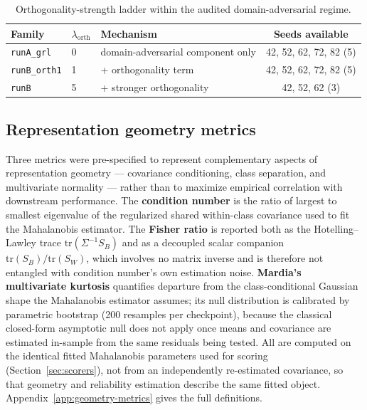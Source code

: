 \begin{table}[t]
\centering
\caption{Orthogonality-strength ladder within the audited domain-adversarial regime.}
\label{tab:ladder}
\small
\begin{tabular}{lllc}
\toprule
Family & $\lambda_{\mathrm{orth}}$ & Mechanism & Seeds available \\
\midrule
\texttt{runA\_grl} & 0 & domain-adversarial component only & 42, 52, 62, 72, 82 (5) \\
\texttt{runB\_orth1} & 1 & + orthogonality term & 42, 52, 62, 72, 82 (5) \\
\texttt{runB} & 5 & + stronger orthogonality & 42, 52, 62 (3) \\
\bottomrule
\end{tabular}
\end{table}

\subsection{Representation geometry metrics}
\label{sec:geometry-metrics}

Three metrics were pre-specified to represent complementary aspects of representation geometry --- covariance conditioning, class separation, and multivariate normality --- rather than to maximize empirical correlation with downstream performance. The \textbf{condition number} is the ratio of largest to smallest eigenvalue of the regularized shared within-class covariance used to fit the Mahalanobis estimator. The \textbf{Fisher ratio} is reported both as the Hotelling--Lawley trace $\mathrm{tr}(\Sigma^{-1}S_B)$ and as a decoupled scalar companion $\mathrm{tr}(S_B)/\mathrm{tr}(S_W)$, which involves no matrix inverse and is therefore not entangled with condition number's own estimation noise. \textbf{Mardia's multivariate kurtosis} \citep{mardia1970measures} quantifies departure from the class-conditional Gaussian shape the Mahalanobis estimator assumes; its null distribution is calibrated by parametric bootstrap (200 resamples per checkpoint), because the classical closed-form asymptotic null does not apply once means and covariance are estimated in-sample from the same residuals being tested. All are computed on the identical fitted Mahalanobis parameters used for scoring (Section~\ref{sec:scorers}), not from an independently re-estimated covariance, so that geometry and reliability estimation describe the same fitted object. Appendix~\ref{app:geometry-metrics} gives the full definitions.

